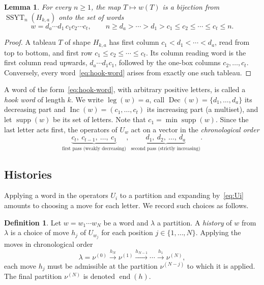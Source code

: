 \documentclass[11pt]{amsart}
\numberwithin{equation}{section}
\newtheorem{lemma}[theorem]{Lemma}
\theoremstyle{definition}
\newtheorem{definition}[theorem]{Definition}
\theoremstyle{remark}
\newcommand{\SSYT}{\operatorname{SSYT}}
\newcommand{\leg}{\operatorname{leg}}
\newcommand{\supp}{\operatorname{supp}}
\newcommand{\Inc}{\operatorname{Inc}}
\newcommand{\Dec}{\operatorname{Dec}}
\newcommand{\enD}{\operatorname{end}}
\begin{document}
\begin{lemma}\label{lem:hook-words}
For every $n\geq1$, the map $T\mapsto w(T)$ is a bijection from
$\SSYT_n(H_{k,a})$ onto the set of words
\begin{equation}\label{eq:hook-word}
 w=d_a\cdots d_1\,c_1c_2\cdots c_t,
 \qquad
 n\geq d_a>\cdots>d_1>c_1\leq c_2\leq\cdots\leq c_t\leq n .
\end{equation}
\end{lemma}

\begin{proof}
A tableau $T$ of shape $H_{k,a}$ has first column $c_1<d_1<\cdots<d_a$, read
from top to bottom, and first row $c_1\leq c_2\leq\cdots\leq c_t$. Its column
reading word is the first column read upwards, $d_a\cdots d_1c_1$, followed
by the one-box columns $c_2,\dots,c_t$. Conversely, every
word~\eqref{eq:hook-word} arises from exactly one such tableau.
\end{proof}

A word of the form~\eqref{eq:hook-word}, with arbitrary positive letters, is
called a \emph{hook word} of length $k$. We write $\leg(w)=a$, call
$\Dec(w)=\{d_1,\dots,d_a\}$ its decreasing part and
$\Inc(w)=(c_1,\dots,c_t)$ its increasing part (a multiset), and let
$\supp(w)$ be its set of letters. Note that $c_1=\min\supp(w)$. Since the
last letter acts first, the operators of $U_w$ act on a vector in the
\emph{chronological order}
\begin{equation}\label{eq:two-pass}
 \underbrace{c_t,\ c_{t-1},\ \dots,\ c_1}_{\text{first pass (weakly decreasing)}}
 ,\ \underbrace{d_1,\ d_2,\ \dots,\ d_a}_{\text{second pass (strictly increasing)}} .
\end{equation}

\subsection{Histories}

Applying a word in the operators $U_i$ to a partition and expanding
by~\eqref{eq:Ui} amounts to choosing a move for each letter. We record such
choices as follows.

\begin{definition}\label{def:history}
Let $w=w_1\cdots w_N$ be a word and $\lambda$ a partition. A \emph{history}
of $w$ from $\lambda$ is a choice of move $h_j$ of $U_{w_j}$ for each
position $j\in\{1,\ldots,N\}$. Applying the moves in chronological order
\[
 \lambda = \nu^{(0)} \xrightarrow{h_N} \nu^{(1)} \xrightarrow{h_{N-1}} \cdots \xrightarrow{h_1} \nu^{(N)},
\]
each move $h_j$ must be admissible at the partition $\nu^{(N-j)}$ to which
it is applied. The final partition $\nu^{(N)}$ is denoted $\enD(h)$.
\end{definition}
\end{document}
